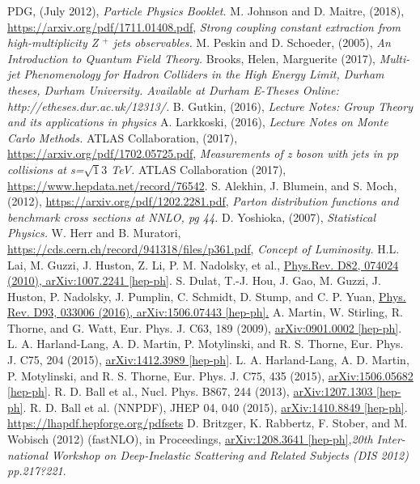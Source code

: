\documentclass[12pt, onecolumn]{revtex4}    %
\begin{document}
\begin{thebibliography}{99}

 PDG, (July 2012), \textit{Particle Physics Booklet.}
M. Johnson and D. Maitre, (2018), \url{https://arxiv.org/pdf/1711.01408.pdf}, \textit{Strong coupling constant extraction from high-multiplicity Z ${^+}$ jets observables.}
 M. Peskin and D. Schoeder, (2005), \textit{An Introduction to Quantum Field Theory.}
Brooks, Helen, Marguerite (2017), \textit{Multi-jet Phenomenology for Hadron Colliders in the High Energy Limit, Durham theses, Durham University. Available at Durham E-Theses Online: http://etheses.dur.ac.uk/12313/.}
 B. Gutkin, (2016), \textit{Lecture Notes: Group Theory and its applications in physics}
 A. Larkkoski, (2016), \textit{Lecture Notes on Monte Carlo Methods.}
 ATLAS Collaboration, (2017), \url{https://arxiv.org/pdf/1702.05725.pdf}, \textit{Measurements of z boson with jets in pp collisions at s=${\sqrt 13}$ TeV.}
 ATLAS Collaboration (2017), \url{https://www.hepdata.net/record/76542}.
 S. Alekhin, J. Blumein, and S. Moch, (2012), \url{https://arxiv.org/pdf/1202.2281.pdf}, \textit{Parton distribution functions and benchmark cross sections at NNLO, pg 44.} 
 D. Yoshioka, (2007), \textit{Statistical Physics.}
 W. Herr and B. Muratori, \url{https://cds.cern.ch/record/941318/files/p361.pdf}, \textit{Concept of Luminosity.}
 H.L. Lai, M. Guzzi, J. Huston, Z. Li, P. M. Nadolsky, et al., \url{Phys.Rev. D82, 074024 (2010), arXiv:1007.2241 [hep-ph]}.
 S. Dulat, T.-J. Hou, J. Gao, M. Guzzi, J. Huston, P. Nadolsky, J. Pumplin, C. Schmidt, D. Stump, and C. P. Yuan, \url{Phys. Rev. D93, 033006 (2016), arXiv:1506.07443 [hep-ph].}
 A. Martin, W. Stirling, R. Thorne, and G. Watt, Eur. Phys. J. C63, 189 (2009), \url{arXiv:0901.0002 [hep-ph]}.
 L. A. Harland-Lang, A. D. Martin, P. Motylinski, and R. S. Thorne, Eur. Phys. J. C75, 204 (2015), \url{arXiv:1412.3989 [hep-ph]}.
 L. A. Harland-Lang, A. D. Martin, P. Motylinski, and R. S. Thorne, Eur. Phys. J. C75, 435 (2015), \url{arXiv:1506.05682 [hep-ph]}.
 R. D. Ball et al., Nucl. Phys. B867, 244 (2013), \url{arXiv:1207.1303 [hep-ph]}.
 R. D. Ball et al. (NNPDF), JHEP 04, 040 (2015), \url{arXiv:1410.8849 [hep-ph]}.
 \url{https://lhapdf.hepforge.org/pdfsets}
 D. Britzger, K. Rabbertz, F. Stober, and M. Wobisch (2012) (fastNLO), in Proceedings, \url{arXiv:1208.3641 [hep-ph]},\textit{20th Inter-national Workshop on Deep-Inelastic Scattering and Related Subjects (DIS 2012) pp.217?221}.

\end{thebibliography} 
\end{document}

